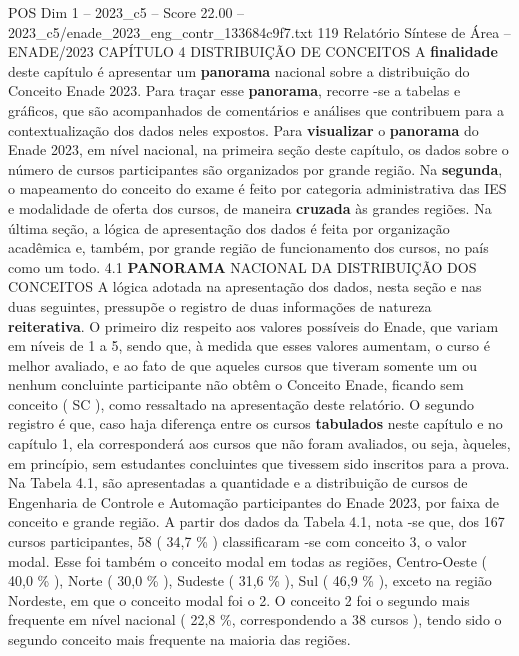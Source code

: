 \begin{textsample}{POS Dim 1 – 2023\_c5 – Score 22.00 – 2023\_c5/enade\_2023\_eng\_contr\_133684c9f7.txt}  \label{ex:f1_pos_007}
119 Relatório Síntese de Área – ENADE/2023 CAPÍTULO 4 DISTRIBUIÇÃO DE CONCEITOS A \textbf{finalidade} deste capítulo é apresentar um \textbf{panorama} nacional sobre a distribuição do Conceito Enade 2023.
Para traçar esse \textbf{panorama}, recorre -se a tabelas e gráficos, que são acompanhados de comentários e análises que contribuem para a contextualização dos dados neles expostos.
Para \textbf{visualizar} o \textbf{panorama} do Enade 2023, em nível nacional, na primeira seção deste capítulo, os dados sobre o número de cursos participantes são organizados por grande região.
Na \textbf{segunda}, o mapeamento do conceito do exame é feito por categoria administrativa das IES e modalidade de oferta dos cursos, de maneira \textbf{cruzada} às grandes regiões.
Na última seção, a lógica de apresentação dos dados é feita por organização acadêmica e, também, por grande região de funcionamento dos cursos, no país como um todo. 4.1 \textbf{PANORAMA} NACIONAL DA DISTRIBUIÇÃO DOS CONCEITOS A lógica adotada na apresentação dos dados, nesta seção e nas duas seguintes, pressupõe o registro de duas informações de natureza \textbf{reiterativa}.
O primeiro diz respeito aos valores possíveis do Enade, que variam em níveis de 1 a 5, sendo que, à medida que esses valores aumentam, o curso é melhor avaliado, e ao fato de que aqueles cursos que tiveram somente um ou nenhum concluinte participante não obtêm o Conceito Enade, ficando sem conceito ( SC ), como ressaltado na apresentação deste relatório.
O segundo registro é que, caso haja diferença entre os cursos \textbf{tabulados} neste capítulo e no capítulo 1, ela corresponderá aos cursos que não foram avaliados, ou seja, àqueles, em princípio, sem estudantes concluintes que tivessem sido inscritos para a prova.
Na Tabela 4.1, são apresentadas a quantidade e a distribuição de cursos de Engenharia de Controle e Automação participantes do Enade 2023, por faixa de conceito e grande região.
A partir dos dados da Tabela 4.1, nota -se que, dos 167 cursos participantes, 58 ( 34,7 \% ) classificaram -se com conceito 3, o valor modal.
Esse foi também o conceito modal em todas as regiões, Centro-Oeste ( 40,0 \% ), Norte ( 30,0 \% ), Sudeste ( 31,6 \% ), Sul ( 46,9 \% ), exceto na região Nordeste, em que o conceito modal foi o 2.
O conceito 2 foi o segundo mais frequente em nível nacional ( 22,8 \%, correspondendo a 38 cursos ), tendo sido o segundo conceito mais frequente na maioria das regiões.

\end{textsample}
